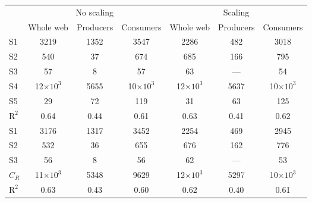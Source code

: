 \documentclass[12pt]{article}
\begin{document}
\begin{table}[tbp]
   \centering
   \begin{tabular}{@{} lcccccc @{}}
      \toprule
      & \multicolumn{3}{c}{No scaling} & \multicolumn{3}{c}{Scaling} \\
      \cmidrule(lr){2-4}
      \cmidrule(lr){5-7}
          				& Whole web 		& Producers & Consumers			& Whole web 		& Producers & Consumers\\
      \midrule
      S1				& 3219				& 1352		& 3547				& 2286				& 482		& 3018		\\
      S2				& 540				& 37		& 674				& 685				& 166		& 795		\\
      S3				& 57  				& 8 		& 57 				& 63				& ---		& 54 		\\
      S4				& 12$\times10^{3}$	& 5655		& 10$\times10^{3}$	& 12$\times10^{3}$	& 5637		& 10$\times10^{3}$	\\
      S5				& 29				& 72		& 119 				& 31				& 63		& 125 		\\
      \midrule
      $\mathrm{R}^{2}$	& 0.64 				& 0.44 		& 0.61 				& 0.63 				& 0.41 		& 0.62		\\
      \midrule
      S1				& 3176				& 1317		& 3452				& 2254				& 469		& 2945		\\
      S2				& 532				& 36		& 655				& 676				& 162		& 776		\\
      S3				& 56  				& 8 		& 56 				& 62				& ---		& 53 		\\
      $C_{R}$			& 11$\times10^{3}$	& 5348		& 9629				& 12$\times10^{3}$	& 5297		& 10$\times10^{3}$	\\
      \midrule
      $\mathrm{R}^{2}$	& 0.63 				& 0.43 		& 0.60 				& 0.62		 		& 0.40 		& 0.61		\\
      \bottomrule
   \end{tabular}
   \label{t:ANOVAwebs}
\end{table}
\end{document}
